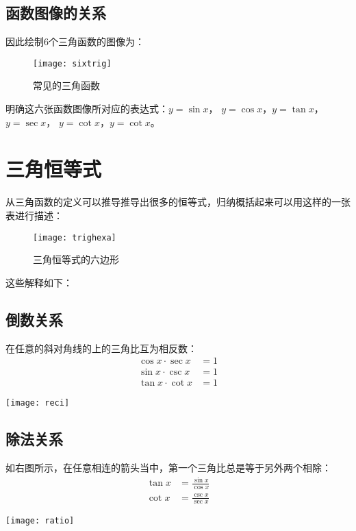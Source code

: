 \subsection*{函数图像的关系} %
因此绘制$6$个三角函数的图像为：
\begin{figure}[H]
\centering
\texttt{[image: sixtrig]}
\caption{常见的三角函数}
\end{figure}

\begin{TaskBox}
 明确这六张函数图像所对应的表达式：$y=\sin x$， $y=\cos x$，$y=\tan x$， $y=\sec x$， $y=\cot x$，$y=\cot x$。
\end{TaskBox}
\clearpage

\section{三角恒等式}
\label{sec:Trig Identity}
从三角函数的定义可以推导推导出很多的恒等式，归纳概括起来可以用这样的一张表进行描述：
\begin{figure}[H]
\centering
\texttt{[image: trighexa]}
\caption{三角恒等式的六边形}
\end{figure}
这些解释如下：

\subsection*{倒数关系}
\begin{minipage}{0.7\linewidth}
在任意的斜对角线的上的三角比互为相反数：
\begin{align*}
	\cos x \cdot \sec x &= 1\\
	\sin x \cdot \csc x &= 1\\
	\tan x \cdot \cot x &= 1
\end{align*}
\end{minipage}
\hfill
\begin{minipage}{0.25\linewidth} %
\texttt{[image: reci]}
\end{minipage}

\subsection*{除法关系}
\begin{minipage}{0.7\linewidth}
如右图所示，在任意相连的箭头当中，第一个三角比总是等于另外两个相除：
\begin{align*}
	\tan x &= \frac{\sin x}{\cos x}\\
	\cot x &=\frac{\csc x}{\sec x}
\end{align*}
\end{minipage}
\hfill
\begin{minipage}{0.3\linewidth}
\texttt{[image: ratio]}
\end{minipage}

